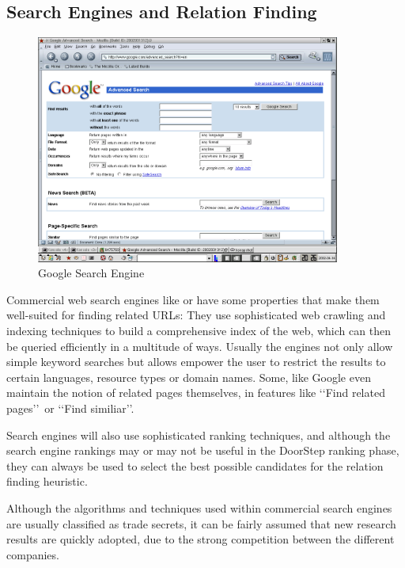 \documentclass[a4paper]{danarticle}
\theoremstyle{remark}
\begin{document}
     \subsection{Search Engines and Relation Finding}
       \begin{figure}[ht]
         \centering
         \includegraphics[width=10cm]{googleadv}
         \caption{Google Search Engine}
         \label{googleadv}
       \end{figure}
       Commercial web search engines like \cite{google} or \cite{altavista} have 
       some properties that make them well-suited for finding related URLs: They 
       use sophisticated web crawling and indexing techniques to build a 
       comprehensive index of the web, which can then be queried efficiently in 
       a multitude of ways. Usually the engines not only allow simple keyword 
       searches but allows empower the user to restrict the results to certain 
       languages, resource types or domain names. Some, like Google\cite{google} 
       even maintain the notion of related pages themselves, in features like 
       \lq\lq Find related pages\rq\rq\ or \lq\lq Find similiar\rq\rq . 
  
       Search engines will also use sophisticated ranking techniques, and 
       although the search engine rankings may or may not be useful in the 
       DoorStep ranking phase, they can always be used to select the best 
       possible candidates for the relation finding heuristic.
       
       Although the algorithms and techniques used within commercial search 
       engines are usually classified as trade secrets, it can be fairly assumed 
       that new research results are quickly adopted, due to the strong 
       competition between the different companies.
       
\end{document}
